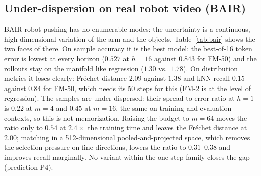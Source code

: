\begin{table}[t]
\caption{Asymmetric bounce ($K{=}2$, $p = 0.787$ on the evaluation contexts, 8k steps, two seeds). Share of the frequent branch among 64 samples per held-out context, its theoretical optimum, coverage of both branches, and the realized-branch share on training contexts (chance $0.5$).}
\label{tab:flatten}
\begin{center}
\small
{}
\end{center}
\end{table}

\subsection{Under-dispersion on real robot video (BAIR)}
\label{sec:bair}
BAIR robot pushing \citep{ebert2017bair} has no enumerable modes: the uncertainty is a continuous, high-dimensional variation of the arm and the objects. Table~\ref{tab:bair} shows the two faces of \nom{} there. On sample accuracy it is the best model: the best-of-16 token error is lowest at every horizon ($0.527$ at $h{=}16$ against $0.843$ for FM-50) and the rollouts stay on the manifold like regression ($1.30$ vs.\ $1.78$). On distribution metrics it loses clearly: Fr\'echet distance $2.09$ against $1.38$ and kNN recall $0.15$ against $0.84$ for FM-50, which needs its 50 steps for this (FM-2 is at the level of regression). The samples are under-dispersed: their spread-to-error ratio at $h{=}1$ is $0.22$ at $m{=}4$ and $0.45$ at $m{=}16$, the same on training and evaluation contexts, so this is not memorization. Raising the budget to $m{=}64$ moves the ratio only to $0.54$ at $2.4\times$ the training time and leaves the Fr\'echet distance at $2.00$; matching in a 512-dimensional pooled-and-projected space, which removes the selection pressure on fine directions, lowers the ratio to $0.31$--$0.38$ and improves recall marginally. No variant within the one-step \nom{} family closes the gap (prediction P4).

